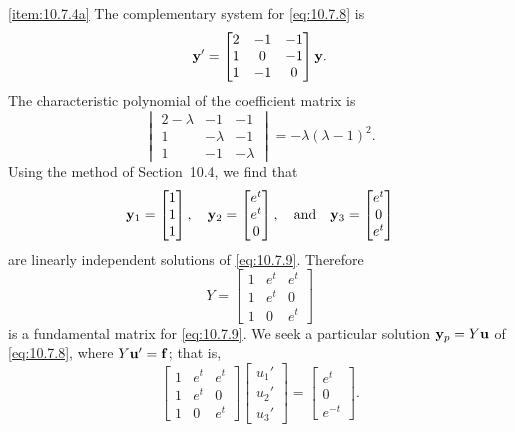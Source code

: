 \documentclass{ximera}
\begin{document}
\begin{example}
\begin{explanation}\ref{item:10.7.4a} 
The complementary system for \eqref{eq:10.7.8} is
\begin{equation} \label{eq:10.7.9}
{\bf y}'=\begin{bmatrix}2&-1&-1\\1&0&-1\\1&-1&0\end{bmatrix}{\bf y}.
\end{equation}
The characteristic polynomial of the coefficient matrix is
$$
\begin{vmatrix}2-\lambda&-1&-1\\1&-\lambda&-1\\1&-1&-\lambda
\end{vmatrix}=
-\lambda(\lambda-1)^2.
$$
Using the method of Section~10.4, we find that
$$
{\bf y}_1=\begin{bmatrix}1\\1\\1\end{bmatrix},\quad
{\bf y}_2=\begin{bmatrix}e^t\\e^t\\0\end{bmatrix},
\quad\mbox{and}\quad
{\bf y}_3=\begin{bmatrix}e^t\\0\\e^t\end{bmatrix}
$$
are linearly independent solutions of \eqref{eq:10.7.9}.
Therefore
$$
Y=\begin{bmatrix}1&e^t&e^t\\1&e^t&0\\1&0&e^t\end{bmatrix}
$$
is a fundamental matrix for  \eqref{eq:10.7.9}.
We seek a particular solution  ${\bf y}_p=Y{\bf u}$ of
\eqref{eq:10.7.8}, where
$Y{\bf u}'={\bf f}$; that is,
$$
\begin{bmatrix}1&e^t&e^t\\1&e^t&0\\1&0&e^t\end{bmatrix}
\begin{bmatrix}u_1'\\u_2'\\u_3'\end{bmatrix}=
\begin{bmatrix}e^t\\0\\e^{-t}\end{bmatrix}.
$$

\end{explanation}
\end{example}
\end{document}
